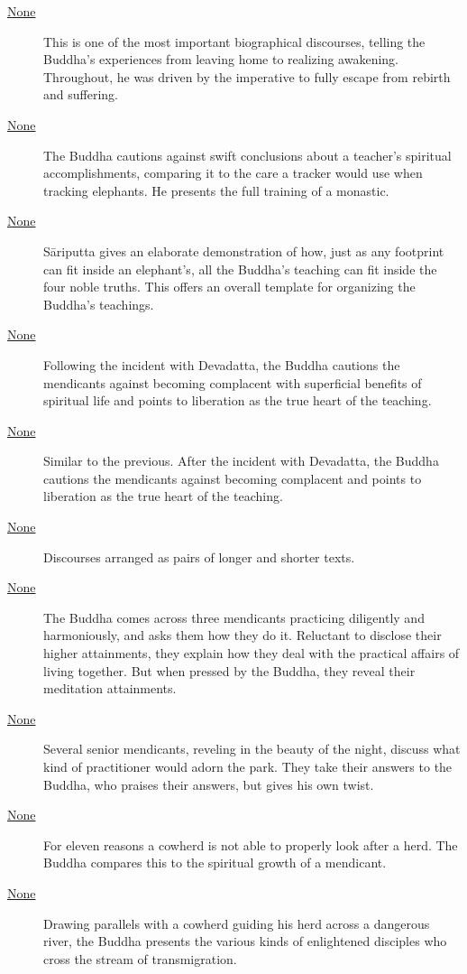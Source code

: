 \documentclass[12pt,openany]{book}%
\begin{document}
\begin{description}
\item[\href{\#mn26}{None}] This is one of the most important biographical discourses, telling the Buddha’s experiences from leaving home to realizing awakening. Throughout, he was driven by the imperative to fully escape from rebirth and suffering.%
\item[\href{\#mn27}{None}] The Buddha cautions against swift conclusions about a teacher’s spiritual accomplishments, comparing it to the care a tracker would use when tracking elephants. He presents the full training of a monastic.%
\item[\href{\#mn28}{None}] \textsanskrit{Sāriputta} gives an elaborate demonstration of how, just as any footprint can fit inside an elephant’s, all the Buddha’s teaching can fit inside the four noble truths. This offers an overall template for organizing the Buddha’s teachings.%
\item[\href{\#mn29}{None}] Following the incident with Devadatta, the Buddha cautions the mendicants against becoming complacent with superficial benefits of spiritual life and points to liberation as the true heart of the teaching.%
\item[\href{\#mn30}{None}] Similar to the previous. After the incident with Devadatta, the Buddha cautions the mendicants against becoming complacent and points to liberation as the true heart of the teaching.%
\item[\href{\#mn{-}mahayamakavagga}{None}] Discourses arranged as pairs of longer and shorter texts.%
\item[\href{\#mn31}{None}] The Buddha comes across three mendicants practicing diligently and harmoniously, and asks them how they do it. Reluctant to disclose their higher attainments, they explain how they deal with the practical affairs of living together. But when pressed by the Buddha, they reveal their meditation attainments.%
\item[\href{\#mn32}{None}] Several senior mendicants, reveling in the beauty of the night, discuss what kind of practitioner would adorn the park. They take their answers to the Buddha, who praises their answers, but gives his own twist.%
\item[\href{\#mn33}{None}] For eleven reasons a cowherd is not able to properly look after a herd. The Buddha compares this to the spiritual growth of a mendicant.%
\item[\href{\#mn34}{None}] Drawing parallels with a cowherd guiding his herd across a dangerous river, the Buddha presents the various kinds of enlightened disciples who cross the stream of transmigration.%

\end{description}
\end{document}
